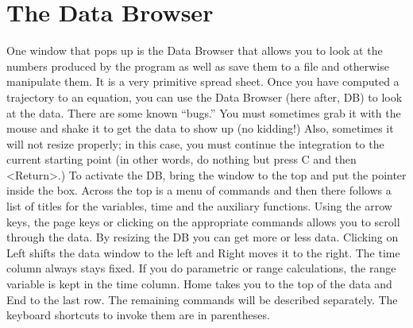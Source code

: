 \section{The Data Browser}
One window that pops up is the Data Browser that allows you to look at
the numbers produced by the program as well as save them to a file and
otherwise manipulate them.  It is a very primitive spread sheet.  Once
you have computed a trajectory to an equation, you can use the Data
Browser (here after, DB) to look at the data. There are some known
``bugs.'' You must sometimes grab it with the mouse and shake it to
get the data to show up (no kidding!) Also, sometimes it will not
resize properly; in this case, you must continue the integration to
the current starting point (in other words, do nothing but press C and
then <Return>.) To activate the DB, bring the window to the top and
put the pointer inside the box.  Across the top is a menu of commands
and then there follows a list of titles for the variables, time and
the auxiliary functions. Using the arrow keys, the page keys or
clicking on the appropriate commands allows you to scroll through the
data. By resizing the DB you can get more or less data.  Clicking on
Left shifts the data window to the left and Right moves it to the
right.  The time column always stays fixed.  If you do parametric or
range calculations, the range variable is kept in the time column.
Home takes you to the top of the data and End to the last row.  The
remaining commands will be described separately. The keyboard
shortcuts to invoke them are in parentheses.
